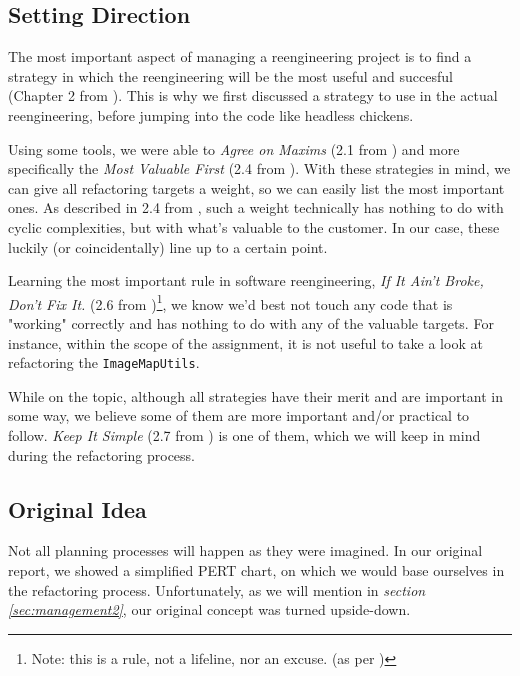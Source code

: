 \documentclass[11pt]{article}
\begin{document}
	\subsection{Setting Direction}
	The most important aspect of managing a reengineering project is to find a strategy in which the reengineering will be the most useful and succesful (Chapter 2 from \cite{demeyer2009object}). This is why we first discussed a strategy to use in the actual reengineering, before jumping into the code like headless chickens.
	
	Using some tools, we were able to \textsl{Agree on Maxims} (2.1 from \cite{demeyer2009object}) and more specifically the \textsl{Most Valuable First} (2.4 from \cite{demeyer2009object}). With these strategies in mind, we can give all refactoring targets a weight, so we can easily list the most important ones. As described in 2.4 from \cite{demeyer2009object}, such a weight technically has nothing to do with cyclic complexities, but with what's valuable to the customer. In our case, these luckily (or coincidentally) line up to a certain point.
	
	Learning the most important rule in software reengineering,
	\textsl{If It Ain't Broke, Don't Fix It.} (2.6 from \cite{demeyer2009object})\footnote{Note: this is a rule, not a lifeline, nor an excuse. (as per \cite{demeyer2009object})}, we know we'd best not touch any code that is "working" correctly and has nothing to do with any of the valuable targets. For instance, within the scope of the assignment, it is not useful to take a look at refactoring the \texttt{ImageMapUtils}.
	
	While on the topic, although all strategies have their merit and are important in some way, we believe some of them are more important and/or practical to follow. \textsl{Keep It Simple} (2.7 from \cite{demeyer2009object}) is one of them, which we will keep in mind during the refactoring process.
	
	\subsection{Original Idea}
	\label{sec:original}
	Not all planning processes will happen as they were imagined. In our original report, we showed a simplified \textsf{PERT} chart, on which we would base ourselves in the refactoring process. Unfortunately, as we will mention in \textsl{section \ref{sec:management2}}, our original concept was turned upside-down.
	
\end{document}
